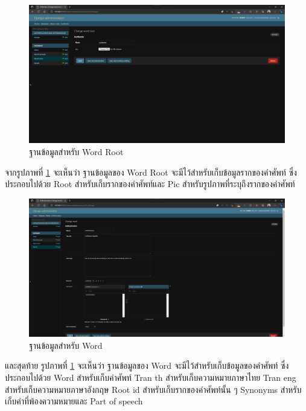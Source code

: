 \documentclass[12pt,oneside,openright,a4paper]{cpe-thai-project}
\begin{document}
\pagebreak
\begin{figure}[!h]\centering
	\includegraphics[width=\textwidth, keepaspectratio=true]{image/chap4/DB/word root.png}
	\caption{{ฐานข้อมูลสำหรับ Word Root}}\label{fig:chap4WordRoot}
\end{figure}
\hspace{1cm}
จากรูปภาพที่ \ref{fig:chap4WordRoot} จะเห็นว่า ฐานข้อมูลของ Word Root จะมีไว้สำหรับเก็บข้อมูลรากของคำศัพท์
ซึ่งประกอบไปด้วย Root สำหรับเก็บรากของคำศัพท์และ Pic สำหรับรูปภาพที่ระบุถึงรากของคำศัพท์

\begin{figure}[!h]\centering
	\includegraphics[width=\textwidth, keepaspectratio=true]{image/chap4/DB/word.png}
	\caption{{ฐานข้อมูลสำหรับ Word}}\label{fig:chap4Word}
\end{figure}
\hspace{1cm}
และสุดท้าย รูปภาพที่ \ref{fig:chap4WordRoot} จะเห็นว่า ฐานข้อมูลของ Word จะมีไว้สำหรับเก็บข้อมูลของคำศัพท์
ซึ่งประกอบไปด้วย Word สำหรับเก็บคำศัพท์ Tran th สำหรับเก็บความหมายภาษาไทย Tran eng สำหรับเก็บความหมายภาษาอังกฤษ
Root id สำหรับเก็บรากของคำศัพท์นั้น ๆ  Synonyms สำหรับเก็บคำที่พ้องความหมายและ Part of speech 
\end{document}
